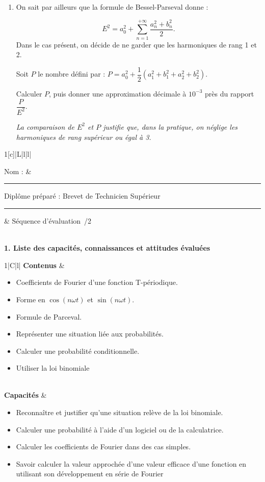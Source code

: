 \documentclass[11pt]{article}
\newcommand{\cadreblanc}[1]{%
\medskip\framebox[\linewidth][c]{%
\rule{0mm}{#1mm}}\par
\medskip}
\newcommand{\diplome}{Brevet de Technicien Supérieur}
\newcommand{\sequence}{2/2}
\newcommand{\contenus}{
  \begin{minipage}[c]{12.5cm}
    \begin{itemize}
      \item \rule{0ex}{2.5ex} Coefficients de Fourier d'une fonction T-périodique.
      \item Forme en $\cos(n\omega t)$ et $\sin(n\omega t)$.
      \item Formule de Parceval.  
      \item Représenter une situation liée aux probabilités.
      \item Calculer une probabilité conditionnelle.
      \item Utiliser la loi binomiale\rule[-1.5ex]{0ex}{3ex} 
      \end{itemize}
    \end{minipage}
  }
\newcommand{\capacites}{
  \begin{minipage}[c]{12.5cm}
    \begin{itemize}
    \item \rule{0ex}{2.5ex}Reconnaître et justifier qu'une situation relève de la loi binomiale.
    \item Calculer une probabilité à l'aide d'un logiciel ou de la calculatrice.
    \item Calculer les coefficients de Fourier dans des cas simples.
    \item Savoir calculer la valeur approchée d'une valeur efficace d'une
fonction en utilisant son développement en série de Fourier  
\rule[-1.5ex]{0ex}{3ex}
    \end{itemize}
    \end{minipage}
  }
\begin{document}
\begin{enumerate}
\begin{enumerate}
		
		 \item On sait par ailleurs que la formule de Bessel-Parseval donne :

\[E^2	= a_{0}^2 + \sum_{n = 1}^{+ \infty} \dfrac{a_{n}^2 + b_{n}^2}{2}.\]
Dans le cas présent, on décide de ne garder que les harmoniques de rang 1 et 2.

Soit $P$ le nombre défini par : $P=a_{0}^2 +  \dfrac{1}{2}\left(a_{1}^2 + b_{1}^2 + a_{2}^2  +b_{2}^2\right)$.

Calculer $P$, puis donner une approximation décimale à $10^{-3}$ près du rapport $\dfrac{P}{E^2}$.


\emph{La comparaison de $E^2$ et $P$ justifie que, dans la pratique, on néglige les harmoniques de rang supérieur ou égal à 3.}
 	\end{enumerate}
\end{enumerate}
	\cadreblanc{50}
\vfill   


\newpage


\small

\thispagestyle{empty}

\noindent\begin{tabularx}{1\linewidth}[c]{|L|l|l|}
  \hline
  \\
  \hline
  \rule[-1ex]{0ex}{4ex} Nom : & \rule{.3cm}{0cm}Diplôme
  préparé : \diplome\rule{.3cm}{0cm} &  Séquence
  d'évaluation~\no\sequence \\
 \hline\end{tabularx}\\[.3cm]


\textbf{1.  Liste des capacités, connaissances et attitudes évaluées} 
\begin{center}
  \begin{tabularx}{1\linewidth}{|C|l|}
    \hline
    \textbf{Contenus} &
    \contenus\\
    \hline 
    \textbf{Capacités} &
    \capacites   \\
    \hline
  \end{tabularx}
\end{center}
\end{document}
